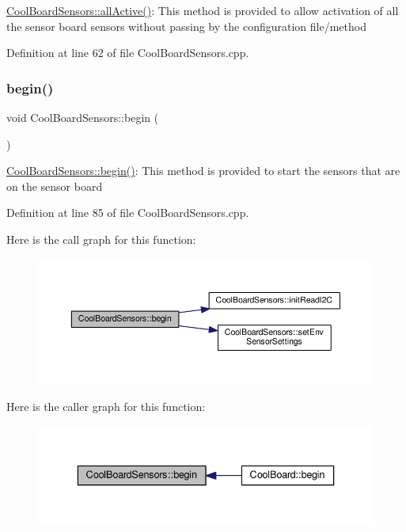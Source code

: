 \hyperlink{class_cool_board_sensors_aa432c5aac88f89c31a10766390f23e0b}{Cool\+Board\+Sensors\+::all\+Active()}\+: This method is provided to allow activation of all the sensor board sensors without passing by the configuration file/method 

Definition at line 62 of file Cool\+Board\+Sensors.\+cpp.

\mbox{\label{class_cool_board_sensors_a97095823ef7c8f5290812f1405b966b3}} 
\subsubsection{\texorpdfstring{begin()}{begin()}}
{\footnotesize\ttfamily void Cool\+Board\+Sensors\+::begin (\begin{DoxyParamCaption}{ }\end{DoxyParamCaption})}

\hyperlink{class_cool_board_sensors_a97095823ef7c8f5290812f1405b966b3}{Cool\+Board\+Sensors\+::begin()}\+: This method is provided to start the sensors that are on the sensor board 

Definition at line 85 of file Cool\+Board\+Sensors.\+cpp.

Here is the call graph for this function\+:\nopagebreak
\begin{figure}[H]
\begin{center}
\leavevmode
\includegraphics[width=350pt]{class_cool_board_sensors_a97095823ef7c8f5290812f1405b966b3_cgraph}
\end{center}
\end{figure}
Here is the caller graph for this function\+:\nopagebreak
\begin{figure}[H]
\begin{center}
\leavevmode
\includegraphics[width=336pt]{class_cool_board_sensors_a97095823ef7c8f5290812f1405b966b3_icgraph}
\end{center}
\end{figure}
\mbox{\label{class_cool_board_sensors_a9a218895c5423375c33c08f2c56fb23a}} 
